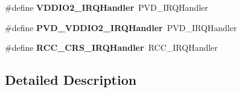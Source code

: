 \begin{DoxyCompactItemize}
\item 
\mbox{\label{group__stm32f031x6_gac1854dcfbcf2950cee25063d73a5edb0}} 
\#define {\bfseries V\+D\+D\+I\+O2\+\_\+\+I\+R\+Q\+Handler}~P\+V\+D\+\_\+\+I\+R\+Q\+Handler
\item 
\mbox{\label{group__stm32f031x6_ga9a2577324b65f147fff0fc4f38dcf5e2}} 
\#define {\bfseries P\+V\+D\+\_\+\+V\+D\+D\+I\+O2\+\_\+\+I\+R\+Q\+Handler}~P\+V\+D\+\_\+\+I\+R\+Q\+Handler
\item 
\mbox{\label{group__stm32f031x6_ga82a9eac30db2cc914975bc71ce5fcb92}} 
\#define {\bfseries R\+C\+C\+\_\+\+C\+R\+S\+\_\+\+I\+R\+Q\+Handler}~R\+C\+C\+\_\+\+I\+R\+Q\+Handler
\end{DoxyCompactItemize}


\subsection{Detailed Description}
